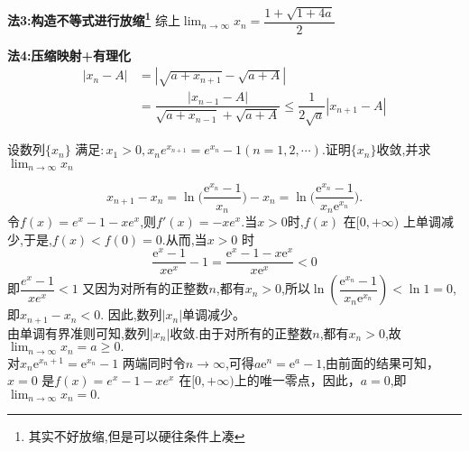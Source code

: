 \documentclass[8pt a4paper, oneside, UTF8]{ctexbook}
\begin{document}
\begin{sloppypar}
\begin{solution}{\textbf{法3:构造不等式进行放缩\footnote{其实不好放缩,但是可以硬往条件上凑}}}
        综上$\lim_{n\to \infty}x_n=\dfrac{1+\sqrt{1+4a}}{2}$
        \end{solution}
        \begin{solution}{\textbf{法4:压缩映射+有理化}}
            \begin{align*}
              |x_n -A| & = |\sqrt{a+x_{n+1}}-\sqrt{a+A}|\\
              & = \dfrac{|x_{n-1}-A|}{\sqrt{a+x_{n-1}}+\sqrt{a+A}} \leqslant \dfrac{1}{2\sqrt{a}}|x_{n+1}-A|
            \end{align*}
        \end{solution}
    \begin{problem}
        设数列$\{x_n\}$ 满足$:x_1>0,x_ne^{x_{n+1}}=e^{x_n}-1(n=1,2,\cdots)$.证明$\{x_n\}$收敛,并求$\lim_{n\to\infty} x_n$     
    \end{problem}
    \begin{solution}
        $$ 
           x_{n+1} - x_{n} = \ln\biggl(\frac{\mathrm{e}^{x_{n}} - 1}{x_{n}}\biggr)- x_{n} = \ln\biggl(\frac{\mathrm{e}^{x_{n}} - 1}{x_{n}\mathrm{e}^{x_{n}}}\biggr).
        $$
        令$f(x)=e^x-1-xe^x$,则$f'(x)=-xe^x$.当$x>0$时,$f(x)$ 在$[0,+\infty)$ 上单调减少,于是,$f(x)<f\left(0\right)=0.$从而,当$x>0$ 时
        $$
            \dfrac{\mathrm{e}^x-1}{x\mathrm{e}^x}-1 = \dfrac{\mathrm{e}^x-1-x\mathrm{e}^x}{x\mathrm{e}^x}<0
        $$即$\dfrac{e^x-1}{xe^x}<1$
        又因为对所有的正整数$n$,都有$x_n>0$,所以$\ln\left(\dfrac{\mathrm{e}^{x_n}-1}{x_n\mathrm{e}^{x_n}}\right)<\ln1=0$,即$x_{n+1}-x_n<0.$ 因此,数列$|x_n|$单调减少。\\
        由单调有界准则可知,数列$|x_n|$收敛.由于对所有的正整数$n$,都有$x_n>0$,故$\lim_{n\to\infty}x_n=a\geqslant0.$\\
        对$x_n\mathrm{e}^{x_n+1}=\mathrm{e}^{x_n}-1$ 两端同时令$n\to\infty$,可得$a\mathrm{e}^n=\mathrm{e}^a-1$,由前面的结果可知，$x=0$ 是$f(x)=e^x-1-xe^x$ 在$[0,+\infty)$上的唯一零点，因此，$a=0$,即$\lim_{n\to \infty}x_n=0.$
    \end{solution}
    \ifx\allfiles\undefined
\end{sloppypar}
\end{document}
